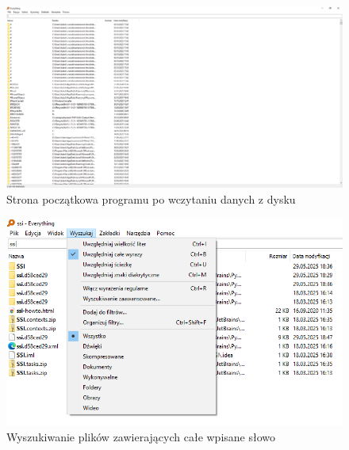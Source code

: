 \documentclass[0.82pt,a4paper]{article}
\begin{document}
    \begin{figure}[H]
        \centering
        \includegraphics[width=0.8\linewidth]{media/EverythingTool/ev1.PNG}
        \caption[Everything glowne]{Strona początkowa programu po wczytaniu danych z dysku}
        \label{fig:ev_glowna}
    \end{figure}
    
    \begin{figure}[H]
        \centering
        \includegraphics[width=0.8\linewidth]{media/EverythingTool/ev2.png}
        \caption[everything filtr slowa]{Wyszukiwanie plików zawierających całe wpisane słowo}
        \label{fig:ev_slowo}
    \end{figure}
\end{document}

